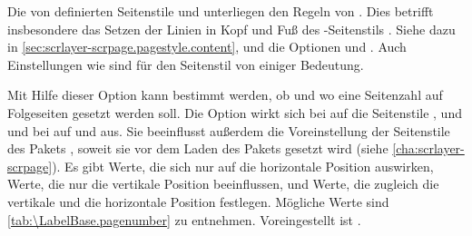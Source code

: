 Die von  definierten Seitenstile
 und
 unterliegen den Regeln von
\hyperref[cha:scrlayer-scrpage]{}. Dies betrifft
insbesondere das Setzen der Linien in Kopf und Fuß des
-Seitenstils
. Siehe dazu in
\autoref{sec:scrlayer-scrpage.pagestyle.content},
 und
 die Optionen
 und
. Auch Einstellungen wie
 sind für den Seitenstil
 von einiger Bedeutung.%
%
\EndIndexGroup


\begin{Declaration}
\end{Declaration}
Mit Hilfe dieser Option kann bestimmt werden, ob und wo eine Seitenzahl auf
Folgeseiten gesetzt werden soll.  Die Option wirkt sich bei
 auf die
Seitenstile
,
 und
 und bei
 auf
 und
 aus. Sie beeinflusst außerdem die
Voreinstellung der Seitenstile des Pakets
\hyperref[cha:scrlayer-scrpage]{}%
%
, soweit sie vor dem Laden des Pakets gesetzt
wird (siehe \autoref{cha:scrlayer-scrpage}). Es gibt Werte, die sich nur auf
die horizontale Position auswirken, Werte, die nur die vertikale Position
beeinflussen, und Werte, die zugleich die vertikale und die horizontale
Position festlegen. Mögliche Werte sind \autoref{tab:\LabelBase.pagenumber} zu
entnehmen. Voreingestellt ist .

